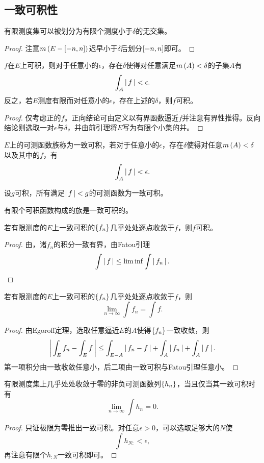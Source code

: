\documentclass{ctexrep}
\begin{document}
  \subsection{一致可积性}
  \begin{lemma}
    有限测度集可以被划分为有限个测度小于$\delta$的无交集。
  \end{lemma}
  \begin{proof}
    注意$m\left(E-\left[-n,n\right]\right)$迟早小于$\delta$后划分$\left[-n,n\right]$即可。
  \end{proof}
  \begin{proposition}
    \label{prp:previtali}
    $f$在$E$上可积，则对于任意小的$\epsilon$，存在$\delta$使得对任意满足$m\left(A\right)<\delta$的子集$A$有
    \[ \int_A\left|\, f \,\right|<\epsilon. \]
    反之，若$E$测度有限而对任意小的$\epsilon$，存在上述的$\delta$，则$f$可积。
  \end{proposition}
  \begin{proof}
    仅考虑正的$f$。正向结论可由定义以有界函数逼近$f$并注意有界性推得。反向结论则选取一对$\epsilon$与$\delta$，并由前引理将$E$写为有限个小集的并。
  \end{proof}
  \begin{definition}
    $E$上的可测函数族称为一致可积，若对于任意小的$\epsilon$，存在$\delta$使得对任意$m\left(A\right)<\delta$以及其中的$f$，有
    \[ \int_A \left|\, f \,\right| < \epsilon. \]
  \end{definition}
  \begin{ex}
    设$g$可积，所有满足$\left|\, f \,\right|<g$的可测函数为一致可积。
  \end{ex}
  \begin{proposition}
    有限个可积函数构成的族是一致可积的。
  \end{proposition}
  \begin{proposition}
    若有限测度的$E$上一致可积的$\left\{f_n\right\}$几乎处处逐点收敛于$f$，则$f$可积。
  \end{proposition}
  \begin{proof}
    由，诸$f_n$的积分一致有界，由Fatou引理
    \[ \int \left|\, f \,\right| \le \lim\inf \int \left|\, f_n \,\right|. \qedhere \]
  \end{proof}
  \begin{theorem}[Vitali收敛定理]
    若有限测度的$E$上一致可积的$\left\{f_n\right\}$几乎处处逐点收敛于$f$，则
    \[ \lim_{n\to\infty}\int f_n = \int f. \]
  \end{theorem}
  \begin{proof}
    由Egoroff定理，选取任意逼近$E$的$A$使得$\left\{f_n\right\}$一致收敛，则
    \[ \left|\, \int_E f_n - \int_E f \,\right| \le \int_{E-A}\left|\, f_n-f \,\right| + \int_A\left|\, f_n \,\right| + \int_A\left|\, f \,\right|. \]
  第一项积分由一致收敛任意小，后二项由一致可积与Fatou引理任意小。
  \end{proof}
  \begin{theorem}
    有限测度集上几乎处处收敛于零的非负可测函数列$\left\{h_n\right\}$，当且仅当其一致可积时有
    \[ \lim_{n\to\infty}\int h_n = 0. \]
  \end{theorem}
  \begin{proof}
    只证极限为零推出一致可积。对任意$\epsilon>0$，可以选取足够大的$N$使
    \[ \int h_{N:} < \epsilon, \]
    再注意有限个$h_{:N}$一致可积即可。
  \end{proof}
\end{document}
